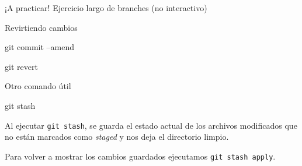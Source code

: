 \begin{frame}[t]{¡A practicar!}
    Ejercicio largo de branches (no interactivo)

\end{frame}

\begin{frame}[t]{Revirtiendo cambios}
    \begin{comando}
        git commit --amend
    \end{comando}


    \vspace{2em}

    \begin{comando}
        git revert
    \end{comando}

\end{frame}

\begin{frame}[t]{Otro comando útil}
    \begin{comando}
        git stash
    \end{comando}

    \pause
    \begin{block}{}
        Al ejecutar \texttt{git stash}, se guarda el estado actual de los archivos modificados que no están marcados como \textit{staged} y nos deja el directorio limpio.

        \vspace{0.5em}

        Para volver a mostrar los cambios guardados ejecutamos \texttt{git stash apply}.
    \end{block}
\end{frame}

